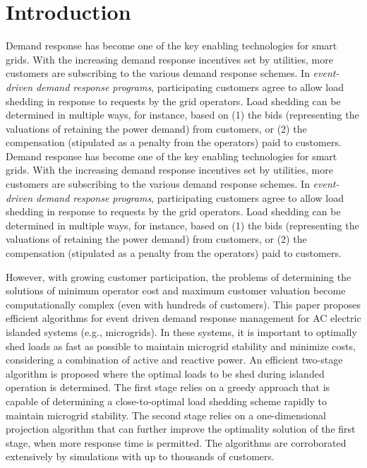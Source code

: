 \section{Introduction}

\iffalse
Demand response has become one of the key enabling technologies for smart grids. With the increasing demand response incentives set by utilities, more customers are subscribing to the various demand response schemes. In {\em event-driven demand response programs}, participating customers agree to allow load shedding in response to requests by the grid operators. Load shedding can be determined in multiple ways, for instance, based on (1) the bids (representing the valuations of retaining the power demand) from customers, or (2) the compensation (stipulated as a penalty from the operators) paid to customers. 
Demand response has become one of the key enabling technologies for smart grids. With the increasing demand response incentives set by utilities, more customers are subscribing to the various demand response schemes. In {\em event-driven demand response programs}, participating customers agree to allow load shedding in response to requests by the grid operators. Load shedding can be determined in multiple ways, for instance, based on (1) the bids (representing the valuations of retaining the power demand) from customers, or (2) the compensation (stipulated as a penalty from the operators) paid to customers. 

However, with growing customer participation, the problems of determining the solutions of minimum operator cost and maximum customer valuation become computationally complex (even with hundreds of customers). This paper proposes efficient algorithms for event driven demand response management for AC electric islanded systems (e.g., microgrids). In these systems, it is important to optimally shed loads as fast as possible to maintain microgrid stability and minimize costs, considering a combination of active and reactive power. An efficient two-stage algorithm is proposed where the optimal loads to be shed during islanded operation is determined. The first stage relies on a greedy approach that is capable of determining a close-to-optimal load shedding scheme rapidly to maintain microgrid stability. The second stage relies on a one-dimensional projection algorithm that can further improve the optimality solution of the first stage, when more response time is permitted. The algorithms are corroborated extensively by simulations with up to thousands of customers.

